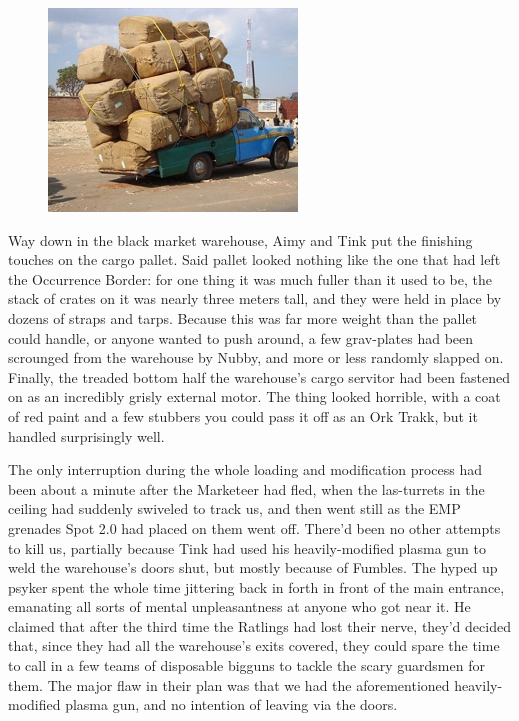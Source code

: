 \begin{figure}
	\begin{center}
		\includegraphics[width=\figwidth]{pics/14/28.png}
	\end{center}
\end{figure}
Way down in the black market warehouse, Aimy and Tink put the finishing touches on the cargo pallet. 
Said pallet looked nothing like the one that had left the Occurrence Border: 
for one thing it was much fuller than it used to be, the stack of crates on it was nearly three meters tall, and they were held in place by dozens of straps and tarps. 
Because this was far more weight than the pallet could handle, or anyone wanted to push around, a few grav-plates had been scrounged from the warehouse by Nubby, and more or less randomly slapped on. 
Finally, the treaded bottom half the warehouse's cargo servitor had been fastened on as an incredibly grisly external motor. 
The thing looked horrible, with a coat of red paint and a few stubbers you could pass it off as an Ork Trakk, but it handled surprisingly well.

The only interruption during the whole loading and modification process had been about a minute after the Marketeer had fled, when the las-turrets in the ceiling had suddenly swiveled to track us, and then went still as the EMP grenades Spot 2.0 had placed on them went off. 
There'd been no other attempts to kill us, partially because Tink had used his heavily-modified plasma gun to weld the warehouse's doors shut, but mostly because of Fumbles. 
The hyped up psyker spent the whole time jittering back in forth in front of the main entrance, emanating all sorts of mental unpleasantness at anyone who got near it. 
He claimed that after the third time the Ratlings had lost their nerve, they'd decided that, since they had all the warehouse's exits covered, they could spare the time to call in a few teams of disposable bigguns to tackle the scary guardsmen for them. 
The major flaw in their plan was that we had the aforementioned heavily-modified plasma gun, and no intention of leaving via the doors.

